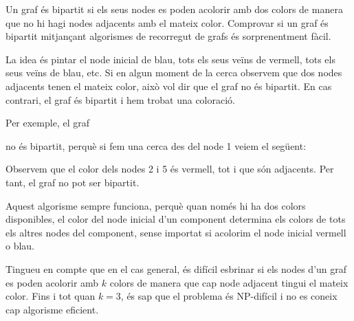 
Un graf és bipartit si els seus nodes es poden acolorir amb dos colors
de manera que no hi hagi nodes adjacents amb el mateix
color. Comprovar si un graf és bipartit mitjançant algorismes de
recorregut de grafs és sorprenentment fàcil.

La idea és pintar el node inicial de blau, tots els seus veïns de
vermell, tots els seus veïns de blau, etc. Si en algun moment de la
cerca observem que dos nodes adjacents tenen el mateix color, això vol
dir que el graf no és bipartit. En cas contrari, el graf és bipartit i
hem trobat una coloració.

Per exemple, el graf
\begin{center}
\end{center}
no és bipartit, perquè si fem una cerca des del node 1 veiem el següent:
\begin{center}
\end{center}
Observem que el color dels nodes 2 i 5 és vermell, tot i que són
adjacents. Per tant, el graf no pot ser bipartit.

Aquest algorisme sempre funciona, perquè quan només hi ha dos colors
disponibles, el color del node inicial d'un component determina els
colors de tots els altres nodes del component, sense importat si
acolorim el node inicial vermell o blau.

Tingueu en compte que en el cas general, és difícil esbrinar si els
nodes d'un graf es poden acolorir amb $k$ colors de manera que cap
node adjacent tingui el mateix color. Fins i tot quan $k=3$, és sap
que el problema és NP-difícil i no es coneix cap algorisme eficient.
